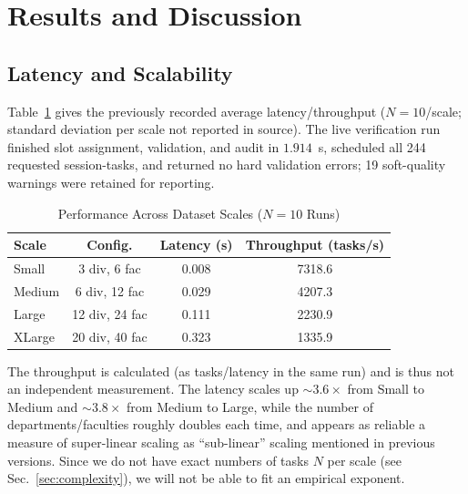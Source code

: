 \documentclass[conference]{IEEEtran}
\begin{document}
\section{Results and Discussion}
\label{sec:results}
\subsection{Latency and Scalability}
Table~\ref{tab:perf} gives the previously recorded average latency/throughput ($N=10$/scale; standard deviation per scale not reported in source). The live verification run finished slot assignment, validation, and audit in $1.914$~s, scheduled all 244 requested session-tasks, and returned no hard validation errors; 19 soft-quality warnings were retained for reporting.

\begin{table}[t]
\caption{Performance Across Dataset Scales ($N=10$ Runs)}
\label{tab:perf}
\centering
\footnotesize
\renewcommand{\arraystretch}{1.2}
\begin{tabular}{lccc}
\toprule
\textbf{Scale} & \textbf{Config.} & \textbf{Latency (s)} & \textbf{Throughput (tasks/s)} \\
\midrule
Small & 3 div, 6 fac & 0.008 & 7318.6 \\
Medium & 6 div, 12 fac & 0.029 & 4207.3 \\
Large & 12 div, 24 fac & 0.111 & 2230.9 \\
XLarge & 20 div, 40 fac & 0.323 & 1335.9 \\
\bottomrule
\end{tabular}
\end{table}

The throughput is calculated (as tasks/latency in the same run) and is thus not an independent measurement. The latency scales up $\sim3.6\times$ from Small to Medium and $\sim3.8\times$ from Medium to Large, while the number of departments/faculties roughly doubles each time, and appears as reliable a measure of super-linear scaling as “sub-linear” scaling mentioned in previous versions. Since we do not have exact numbers of tasks $N$ per scale (see Sec.~\ref{sec:complexity}), we will not be able to fit an empirical exponent.
\end{document}
